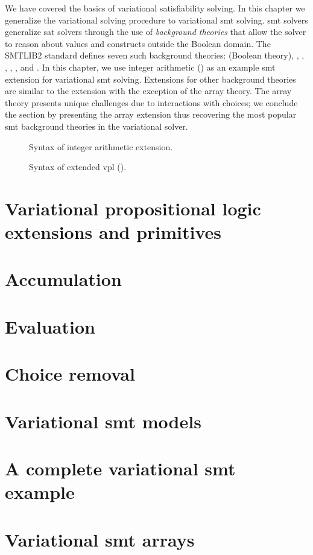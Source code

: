 \label{chapter:vsmt}
%
We have covered the basics of variational satisfiability solving. In this
chapter we generalize the variational solving procedure to variational \ac{smt}
solving.
\ac{smt} solvers generalize \ac{sat} solvers through the use of \emph{background
  theories} that allow the solver to reason about values and constructs outside
the Boolean domain. The SMTLIB2 standard defines seven such background theories:
 (Boolean theory), , ,
, , , and . In this chapter,
we use integer arithmetic () as an example \ac{smt} extension for
variational \ac{smt} solving. Extensions for other background theories are
similar to the  extension with the exception of the array theory. The
array theory presents unique challenges due to interactions with choices; we
conclude the section by presenting the array extension thus recovering the most
popular \ac{smt} background theories in the variational solver.
\begin{figure}
  \centering
  
  \caption{Syntax of integer arithmetic extension.}%
  \label{fig:arith:stx}
\end{figure}
%
\begin{figure}

\centering
\caption{Syntax of extended \ac{vpl} (\evpl{}).}%
\label{fig:arith:vpl}
\end{figure}
%
\section{Variational propositional logic extensions and primitives}
%

\section{Accumulation}
%

\section{Evaluation}
%

\section{Choice removal}
%

\section{Variational \ac{smt} models}
%

\section{A complete variational \ac{smt} example}


\section{Variational \ac{smt} arrays}



